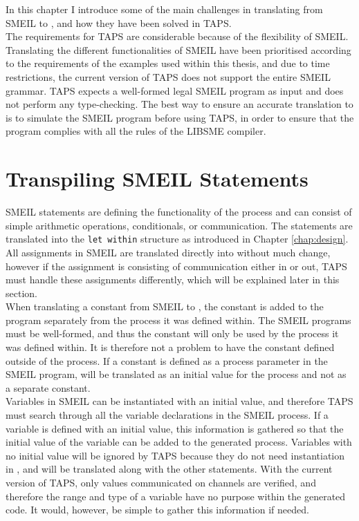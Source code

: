 In this chapter I introduce some of the main challenges in translating from SMEIL to \cspm{}, and how they have been solved in TAPS.\\

The requirements for TAPS are considerable because of the flexibility of SMEIL. Translating the different functionalities of SMEIL have been prioritised according to the requirements of the examples used within this thesis, and due to time restrictions, the current version of TAPS does not support the entire SMEIL grammar. TAPS expects a well-formed legal SMEIL program as input and does not perform any type-checking. The best way to ensure an accurate translation to \cspm{} is to simulate the SMEIL program before using TAPS, in order to ensure that the program complies with all the rules of the LIBSME compiler.
\section{Transpiling SMEIL Statements}
SMEIL statements are defining the functionality of the process and can consist of simple arithmetic operations, conditionals, or communication.
The statements are translated into the \texttt{let within} structure as introduced in Chapter \ref{chap:design}.\\

All assignments in SMEIL are translated directly into \cspm{} without much change, however if the assignment is consisting of communication either in or out, TAPS must handle these assignments differently, which will be explained later in this section.\\

When translating a constant from SMEIL to \cspm{}, the constant is added to the \cspm{} program separately from the process it was defined within.
The SMEIL programs must be well-formed, and thus the constant will only be used by the process it was defined within. It is therefore not a problem to have the constant defined outside of the \cspm{} process. If a constant is defined as a process parameter in the SMEIL program, will be translated as an initial value for the process and not as a separate \cspm{} constant.\\

Variables in SMEIL can be instantiated with an initial value, and therefore TAPS must search through all the variable declarations in the SMEIL process. If a variable is defined with an initial value, this information is gathered so that the initial value of the variable can be added to the generated \cspm{} process.
Variables with no initial value will be ignored by TAPS because they do not need instantiation in \cspm{}, and will be translated along with the other statements. With the current version of TAPS, only values communicated on channels are verified, and therefore the range and type of a variable have no purpose within the generated \cspm{} code. It would, however, be simple to gather this information if needed.\\

